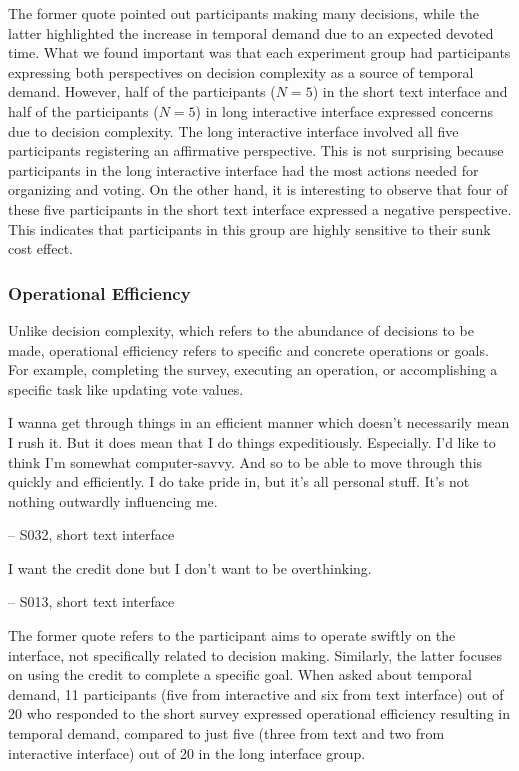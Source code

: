 The former quote pointed out participants making many decisions, while the latter highlighted the increase in temporal demand due to an expected devoted time. What we found important was that each experiment group had participants expressing both perspectives on decision complexity as a source of temporal demand. However, half of the participants ($N=5$) in the short text interface and half of the participants ($N=5$) in long interactive interface expressed concerns due to decision complexity. The long interactive interface involved all five participants registering an affirmative perspective. This is not surprising because participants in the long interactive interface had the most actions needed for organizing and voting. On the other hand, it is interesting to observe that four of these five participants in the short text interface expressed a negative perspective. This indicates that participants in this group are highly sensitive to their sunk cost effect.

\subsubsection{Operational Efficiency}
Unlike decision complexity, which refers to the abundance of decisions to be made, operational efficiency refers to specific and concrete operations or goals. For example, completing the survey, executing an operation, or accomplishing a specific task like updating vote values.

\begin{displayquote}
I wanna get through things in an efficient manner which doesn't necessarily mean I rush it. But it does mean that I do things expeditiously. Especially. I'd like to think I'm somewhat computer-savvy. And so to be able to move through this quickly and efficiently. I do take pride in, but it's all personal stuff. It's not nothing outwardly influencing me. 
        
\noindent \hfill -- S032, short text interface
\end{displayquote}

\begin{displayquote}
I want the credit done but I don't want to be overthinking.
            
\noindent \hfill -- S013, short text interface
\end{displayquote}

The former quote refers to the participant aims to operate swiftly on the interface, not specifically related to decision making. Similarly, the latter focuses on using the credit to complete a specific goal. When asked about temporal demand, 11 participants (five from interactive and six from text interface) out of 20 who responded to the short survey expressed operational efficiency resulting in temporal demand, compared to just five (three from text and two from interactive interface) out of 20 in the long interface group.

